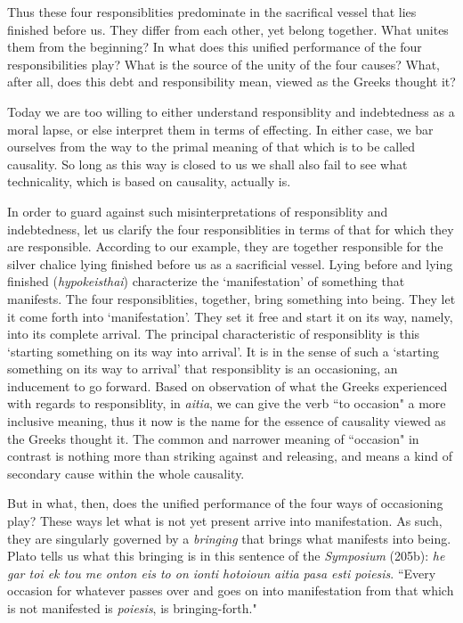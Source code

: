 \documentclass[paper=a4, fontsize=11pt,twoside]{scrartcl}
\begin{document}
Thus these four responsiblities predominate in the sacrifical vessel that lies finished before us. They differ from each other, yet belong together. What unites them from the beginning? In what does this unified performance of the four responsibilities play? What is the source of the unity of the four causes? What, after all, does this debt and responsibility mean, viewed as the Greeks thought it? 

Today we are too willing to either understand responsiblity and indebtedness as a moral lapse, or else interpret them in terms of effecting. In either case, we bar ourselves from the way to the primal meaning of that which is to be called causality. So long as this way is closed to us we shall also fail to see what technicality, which is based on causality, actually is.

In order to guard against such misinterpretations of responsiblity and indebtedness, let us clarify the four responsiblities in terms of that for which they are responsible. According to our example, they are together responsible for the silver chalice lying finished before us as a sacrificial vessel. Lying before and lying finished (\textit{hypokeisthai}) characterize the `manifestation' of something that manifests. The four responsiblities, together, bring something into being. They let it come forth into `manifestation'. They set it free and start it on its way, namely, into its complete arrival. The principal characteristic of responsiblity is this `starting something on its way into arrival'. It is in the sense of such a `starting something on its way to arrival' that responsiblity is an occasioning, an inducement to go forward. Based on observation of what the Greeks experienced with regards to responsiblity, in \textit{aitia}, we can give the verb ``to occasion" a more inclusive meaning, thus it now is the name for the essence of causality viewed as the Greeks thought it. The common and narrower meaning of ``occasion" in contrast is nothing more than striking against and releasing, and means a kind of secondary cause within the whole causality.

But in what, then, does the unified performance of the four ways of occasioning play? These ways let what is not yet present arrive into manifestation. As such, they are singularly governed by a \textit{bringing} that brings what manifests into being. Plato tells us what this bringing is in this sentence of the \textit{Symposium} (205b): \textit{h{\-e} gar toi ek tou m{\-e} onton eis to on ionti hot{\-o}ioun aitia pasa esti poi{\-e}sis}. ``Every occasion for whatever passes over and goes on into manifestation from that which is not manifested is \textit{poi{\-e}sis}, is bringing-forth."
\end{document}
